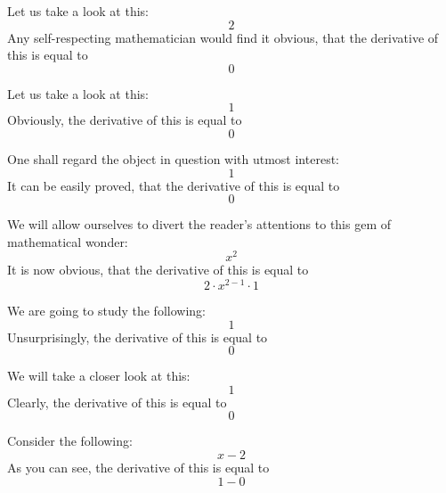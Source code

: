 \documentclass{article}
\begin{document}
Let us take a look at this:
\begin{equation}
2 
\end{equation}
Any self-respecting mathematician would find it obvious, that the derivative of this is equal to
\begin{equation}
0 
\end{equation}

Let us take a look at this:
\begin{equation}
1 
\end{equation}
Obviously, the derivative of this is equal to
\begin{equation}
0 
\end{equation}

One shall regard the object in question with utmost interest:
\begin{equation}
1 
\end{equation}
It can be easily proved, that the derivative of this is equal to
\begin{equation}
0 
\end{equation}

We will allow ourselves to divert the reader's attentions to this gem of mathematical wonder:
\begin{equation}
x ^{2 } 
\end{equation}
It is now obvious, that the derivative of this is equal to
\begin{equation}
2 \cdot x ^{2 - 1 } \cdot 1 
\end{equation}

We are going to study the following:
\begin{equation}
1 
\end{equation}
Unsurprisingly, the derivative of this is equal to
\begin{equation}
0 
\end{equation}

We will take a closer look at this:
\begin{equation}
1 
\end{equation}
Clearly, the derivative of this is equal to
\begin{equation}
0 
\end{equation}

Consider the following:
\begin{equation}
x - 2 
\end{equation}
As you can see, the derivative of this is equal to
\begin{equation}
1 - 0 
\end{equation}
\end{document}

